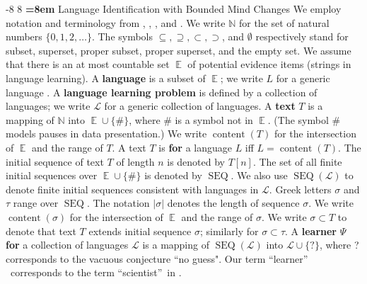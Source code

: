 \documentclass{elsarticle}%
\makeatletter
\renewcommand\subsection{\@startsection {subsection}{1}{\z@}%
  {-8\p@ \@plus -4\p@ \@minus -4\p@}%
                       {8\p@ \@plus 4\p@ \@minus 4\p@}%
                                   {\normalfont\large\bfseries\boldmath
                                   \rightskip=\z@ \@plus 8em\pretolerance=10000 }}
\DeclareMathOperator{\content}{content}
\DeclareMathOperator{\SEQ}{SEQ}
\DeclareMathOperator{\E}{\mathbb{E}}
\renewcommand{\L}{\mathcal{L}}
\makeatother
\begin{document}
\subsection{Language Identification with Bounded Mind Changes \label{sec:mc-bound}}
We employ notation and terminology from \cite{jain02:_mind}, \cite[Ch.1]%
{martin98elements}, \cite{Osherson86}, and \cite{gold67limit}. We write $\mathbb{N}$ for the set
of natural numbers $\{0,1,2,\ldots\}$. The symbols $\subseteq,\supseteq
,\subset,\supset$, and $\emptyset$ respectively stand for subset, superset,
proper subset, proper superset, and the empty set. We assume that there is an at most countable
set $\E$ of potential evidence items (strings in language learning).
A \textbf{language} is a subset of $\E$; we write $L$ for a generic language
\cite[p.449]{gold67limit}. A \textbf{language learning problem} is defined by a
collection of languages; we write $\L$ for a generic collection of
languages. A \textbf{text} $T$ is a mapping of $\mathbb{N}$ into $\E\cup
\{\#\}$, where $\#$ is a symbol not in $\E$. (The symbol $\#$ models pauses in
data presentation.) We write $\content(T)$ for the intersection of $\E$ and the 
range of $T$. A text $T$ is \textbf{for} a language $L$ iff $L=\content(T)$.
The initial sequence of text $T$ of length $n$ is denoted by $T[n]$. The set
of all finite initial sequences over $\E\cup\{\#\}$ is denoted by $\SEQ$. We
also use $\SEQ(\L)$ to denote finite initial sequences consistent with
languages in $\L$. Greek letters $\sigma$ and $\tau$ range over $\SEQ$. The notation $|\sigma|$ denotes the length of sequence $\sigma$. We
write $\content(\sigma)$ for the intersection of $\E$ and the range of $\sigma$. 
We write $\sigma\subset T$ %
to denote that text $T$ extends initial sequence $\sigma$; similarly for $\sigma \subset \tau$.
A {\bf learner} $\Psi$ \textbf{for} a collection of languages 
$\L$ is a mapping of $\SEQ(\L)$ into $\L\cup
\{?\}$, where ? corresponds to the vacuous conjecture ``no guess". Our term \textquotedblleft learner\textquotedblright%
\ corresponds to the term \textquotedblleft scientist\textquotedblright\ in
\cite[Ch.2.1.2]{martin98elements}. 
%
\end{document}
